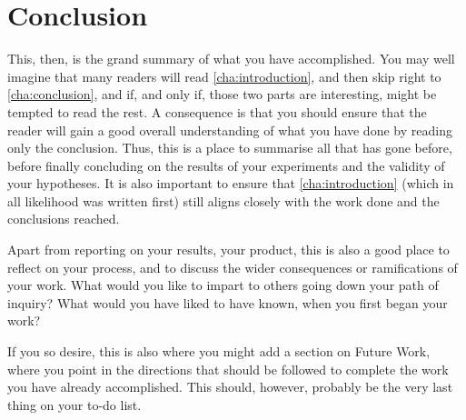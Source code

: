 \chapter{Conclusion}
\label{cha:conclusion}

This, then, is the grand summary of what you have accomplished.  You may
well imagine that many readers will read \autoref{cha:introduction}, and
then skip right to \autoref{cha:conclusion}, and if, and only if, those two
parts are interesting, might be tempted to read the rest. A consequence is
that you should ensure that the reader will gain a good overall
understanding of what you have done by reading only the conclusion.  Thus,
this is a place to summarise all that has gone before, before finally
concluding on the results of your experiments and the validity of your
hypotheses. It is also important to ensure that \autoref{cha:introduction}
(which in all likelihood was written first) still aligns closely with the
work done and the conclusions reached.

Apart from reporting on your results, \ie your product, this is also a good
place to reflect on your process, and to discuss the wider consequences or
ramifications of your work. What would you like to impart to others going
down your path of inquiry? What would you have liked to have known, when you
first began your work?

If you so desire, this is also where you might add a section on Future Work,
where you point in the directions that should be followed to complete the
work you have already accomplished. This should, however, probably be the
very last thing on your to-do list.


